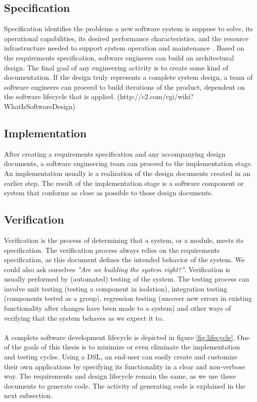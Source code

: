 \subsection{Specification}

Specification identifies the problems a new software system is suppose to solve, its operational capabilities, its desired performance characteristics, and the resource infrastructure needed to support system operation and maintenance \cite{ProcessModels}. Based on the requirements specification, software engineers can build an architectural design. The final goal of any engineering activity is to create some kind of documentation. If the design truly represents a complete system design, a team of software engineers can proceed to build iterations of the product, dependent on the software lifecycle that is applied. (http://c2.com/cgi/wiki?WhatIsSoftwareDesign)

\subsection{Implementation}

After creating a requirements specification and any accompanying design documents, a software engineering team can proceed to the implementation stage. An implementation usually is a realization of the design documents created in an earlier step. The result of the implementation stage is a software component or system that conforms as close as possible to those design documents.

\subsection{Verification}

Verification is the process of determining that a system, or a module, meets its specification. The verification process always relies on the requirements specification, as this document defines the intended behavior of the system. We could also ask ourselves \textit{"Are we building the system right?"}. Verification is usually performed by (automated) testing of the system. The testing process can involve unit testing (testing a component in isolation), integration testing (components tested as a group), regression testing (uncover new errors in existing functionality after changes have been made to a system) and other ways of verifying that the system behaves as we expect it to.
\\ \\
A complete software development lifecycle is depicted in figure \ref{fig:lifecycle}. One of the goals of this thesis is to minimize or even eliminate the implementation and testing cycles. Using a DSL, an end-user can easily create and customize their own applications by specifying its functionality in a clear and non-verbose way. The requirements and design lifecycle remain the same, as we use these documents to generate code. The activity of generating code is explained in the next subsection.

